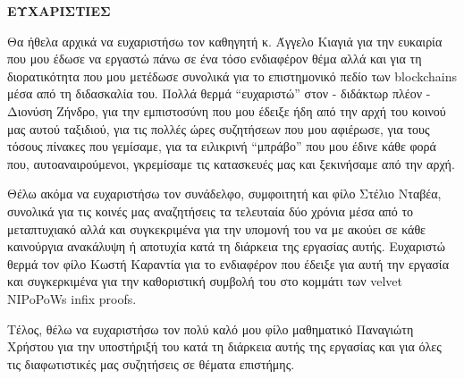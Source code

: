\newpage
\begin{center}
    \Large \textbf{ΕΥΧΑΡΙΣΤΙΕΣ}
\end{center}
Θα ήθελα αρχικά να ευχαριστήσω τον καθηγητή κ. Άγγελο Κιαγιά για την ευκαιρία που μου έδωσε να εργαστώ πάνω σε ένα τόσο ενδιαφέρον θέμα αλλά και για τη διορατικότητα που μου μετέδωσε συνολικά για το επιστημονικό πεδίο των blockchains μέσα από τη διδασκαλία του. Πολλά θερμά ``ευχαριστώ'' στον - διδάκτωρ πλέον - Διονύση Ζήνδρο, για την εμπιστοσύνη που μου έδειξε ήδη από την αρχή του κοινού μας αυτού ταξιδιού, για τις πολλές ώρες συζητήσεων που μου αφιέρωσε, για τους τόσους πίνακες που γεμίσαμε, για τα ειλικρινή ``μπράβο'' που μου έδινε κάθε φορά που, αυτοαναιρούμενοι, γκρεμίσαμε τις κατασκευές μας και ξεκινήσαμε από την αρχή. 

Θέλω ακόμα να ευχαριστήσω τον συνάδελφο, συμφοιτητή και φίλο Στέλιο Νταβέα, συνολικά για τις κοινές μας αναζητήσεις τα τελευταία δύο χρόνια μέσα από το μεταπτυχιακό αλλά και συγκεκριμένα για την υπομονή του να με ακούει σε κάθε καινούργια ανακάλυψη ή αποτυχία κατά τη διάρκεια της εργασίας αυτής. Ευχαριστώ θερμά τον φίλο Κωστή Καραντία για το ενδιαφέρον που έδειξε για αυτή την εργασία και συγκερκιμένα για την καθοριστική συμβολή του στο κομμάτι των velvet NIPoPoWs infix proofs. 

Τέλος, θέλω να ευχαριστήσω τον πολύ καλό μου φίλο μαθηματικό Παναγιώτη Χρήστου για την υποστήριξή του κατά τη διάρκεια αυτής της εργασίας και για όλες τις διαφωτιστικές μας συζητήσεις σε θέματα επιστήμης.
